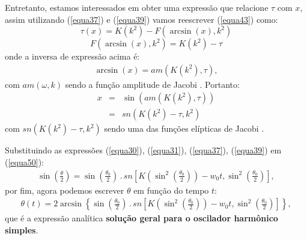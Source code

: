 \documentclass[12pt,openright,twoside,english,brazil]{abntex2}
\begin{document}
Entretanto, estamos interessados em obter uma expressão que relacione $\tau$ com $x$, assim utilizando (\ref{equa37}) e (\ref{equa39}) vamos reescrever (\ref{equa43}) como:
\begin{equation}
 \tau(x) = K(k^2) - F(\arcsin{(x)},k^2) \nonumber
\end{equation}
\begin{equation} 
 F(\arcsin{(x)},k^2) = K(k^2) - \tau
 \label{equa48}
\end{equation}
onde a inversa de expressão acima é:
\begin{eqnarray}
 \arcsin{(x)} = am \left(K (k^2), \tau \right),
\end{eqnarray}
com $am (\omega,k)$ sendo a função amplitude de Jacobi \cite{abramo}. Portanto:
\begin{eqnarray}
x & = & \sin{\left( am \left(K (k^2), \tau \right) \right)} \nonumber \\
  & = & sn \left( K(k^2)-\tau,k^2 \right)
 \label{equa50}
\end{eqnarray}
com $sn(K(k^2)-\tau,k^2)$ sendo uma das funções elípticas de Jacobi \cite{abramo}.

Substituindo as expressões (\ref{equa30}), (\ref{equa31}), (\ref{equa37}), (\ref{equa39}) em (\ref{equa50}):
\begin{eqnarray}
 \sin{\left( \frac{\theta}{2} \right)} = \sin{\left( \frac{\theta_0}{2} \right)}\, . \, sn \left[ K \left( \sin^2{\left( \frac{\theta_0}{2} \right) } \right) - w_0t, \sin^2{\left( \frac{\theta_0}{2} \right) }  \right],
\end{eqnarray}
por fim, agora podemos escrever $\theta$ em função do tempo $t$:
\begin{eqnarray}
\boxed{\theta(t) = 2 \arcsin{\left\{ \sin{\left( \frac{\theta_0}{2} \right)}\, . \, sn \left[ K \left( \sin^2{\left( \frac{\theta_0}{2} \right) } \right) - w_0t, \sin^2{\left( \frac{\theta_0}{2} \right) }  \right] \right\}}},
\label{equa52}
\end{eqnarray}
que é a expressão analítica \textbf{solução geral para o oscilador harmônico simples}.
\end{document}
